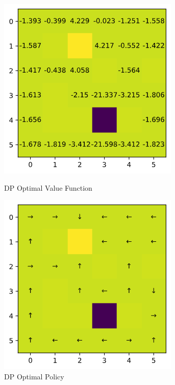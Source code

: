 \documentclass[12pt]{article}
\begin{document}
\begin{figure}[H]
  \centering
  \begin{minipage}[b]{0.3\textwidth}
    \includegraphics[width=\textwidth]{figures/2b2.png}
    \caption{DP Optimal Value Function}
    \label{figure:2b2}
  \end{minipage}
  \hspace{3em}
  \begin{minipage}[b]{0.3\textwidth}
    \includegraphics[width=\textwidth]{figures/2b3.png}
    \caption{DP Optimal Policy}
    \label{figure:2b3}
  \end{minipage}
\end{figure}
\end{document}
